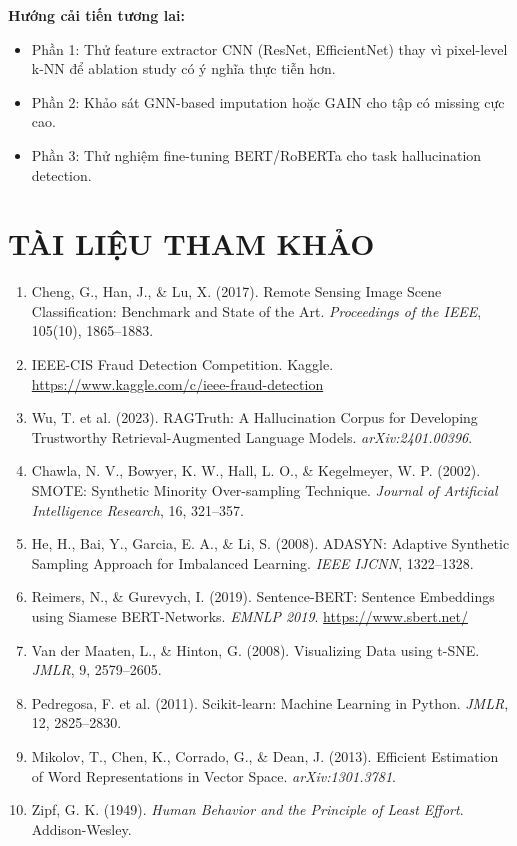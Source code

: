 \documentclass[12pt,a4paper]{article}
\let\oldtextbf\textbf
\renewcommand{\textbf}[1]{\oldtextbf{\textcolor{hcmublue}{#1}}}
\begin{document}
\textbf{Hướng cải tiến tương lai:}
\begin{itemize}
    \item Phần 1: Thử feature extractor CNN (ResNet, EfficientNet) thay vì pixel-level k-NN để ablation study có ý nghĩa thực tiễn hơn.
    \item Phần 2: Khảo sát GNN-based imputation hoặc GAIN cho tập có missing cực cao.
    \item Phần 3: Thử nghiệm fine-tuning BERT/RoBERTa cho task hallucination detection.
\end{itemize}

\section*{TÀI LIỆU THAM KHẢO}

\begin{enumerate}
    \item Cheng, G., Han, J., \& Lu, X. (2017). Remote Sensing Image Scene Classification: Benchmark and State of the Art. \textit{Proceedings of the IEEE}, 105(10), 1865--1883.

    \item IEEE-CIS Fraud Detection Competition. Kaggle. \url{https://www.kaggle.com/c/ieee-fraud-detection}

    \item Wu, T. et al. (2023). RAGTruth: A Hallucination Corpus for Developing Trustworthy Retrieval-Augmented Language Models. \textit{arXiv:2401.00396}.

    \item Chawla, N. V., Bowyer, K. W., Hall, L. O., \& Kegelmeyer, W. P. (2002). SMOTE: Synthetic Minority Over-sampling Technique. \textit{Journal of Artificial Intelligence Research}, 16, 321--357.

    \item He, H., Bai, Y., Garcia, E. A., \& Li, S. (2008). ADASYN: Adaptive Synthetic Sampling Approach for Imbalanced Learning. \textit{IEEE IJCNN}, 1322--1328.

    \item Reimers, N., \& Gurevych, I. (2019). Sentence-BERT: Sentence Embeddings using Siamese BERT-Networks. \textit{EMNLP 2019}. \url{https://www.sbert.net/}

    \item Van der Maaten, L., \& Hinton, G. (2008). Visualizing Data using t-SNE. \textit{JMLR}, 9, 2579--2605.

    \item Pedregosa, F. et al. (2011). Scikit-learn: Machine Learning in Python. \textit{JMLR}, 12, 2825--2830.

    \item Mikolov, T., Chen, K., Corrado, G., \& Dean, J. (2013). Efficient Estimation of Word Representations in Vector Space. \textit{arXiv:1301.3781}.

    \item Zipf, G. K. (1949). \textit{Human Behavior and the Principle of Least Effort}. Addison-Wesley.
\end{enumerate}
\end{document}
